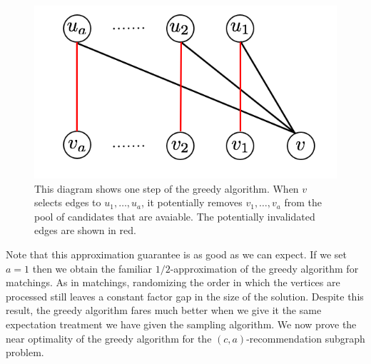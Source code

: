 \begin{figure}[h]
\centering
\includegraphics[width=.5\textwidth]{images/greedy.png}
\begin{minipage}[h]{.8\linewidth}
\caption{This diagram shows one step of the greedy algorithm. When $v$ selects edges to $u_1,\ldots, u_a$, it potentially removes $v_1,\ldots, v_a$ from the pool of candidates that are avaiable. The potentially invalidated edges are shown in red.}
\end{minipage}
\end{figure}

Note that this approximation guarantee is as good as we can expect.
If we set $a=1$ then we obtain the familiar
$1/2$-approximation of the greedy algorithm for matchings. 
As in matchings, randomizing the order in
which the vertices are processed still leaves a constant factor gap
in the size of the solution\cite{KarpVaziraniVazirani1990}.
Despite this result, the greedy algorithm fares much better when we
give it the same expectation treatment we have given the sampling
algorithm. We now prove the near optimality of the greedy algorithm for the
$(c, a)$-recommendation subgraph problem.


